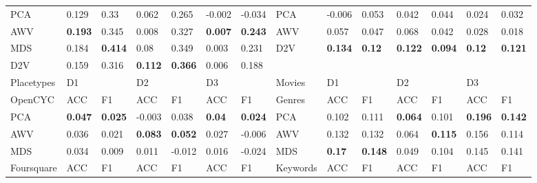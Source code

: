 \begin{landscape}
\begin{table}[]
\begin{tabular}{llllllllllllll}
		PCA        & 0.129          & 0.33           & 0.062          & 0.265          & -0.002         & -0.034         & PCA            & -0.006         & 0.053          & 0.042          & 0.044          & 0.024          & 0.032          \\
		AWV        & \textbf{0.193} & 0.345          & 0.008          & 0.327          & \textbf{0.007} & \textbf{0.243} & AWV            & 0.057          & 0.047          & 0.068          & 0.042          & 0.028          & 0.018          \\
		MDS        & 0.184          & \textbf{0.414} & 0.08           & 0.349          & 0.003          & 0.231          & D2V            & \textbf{0.134} & \textbf{0.12}  & \textbf{0.122} & \textbf{0.094} & \textbf{0.12}  & \textbf{0.121} \\
		D2V        & 0.159          & 0.316          & \textbf{0.112} & \textbf{0.366} & 0.006          & 0.188          &                &                &                &                &                &                &                \\
		Placetypes & D1             &                & D2             &                & D3             &                & Movies         & D1             &                & D2             &                & D3             &                \\
		OpenCYC    & ACC            & F1             & ACC            & F1             & ACC            & F1             & Genres         & ACC            & F1             & ACC            & F1             & ACC            & F1             \\
		PCA        & \textbf{0.047} & \textbf{0.025} & -0.003         & 0.038          & \textbf{0.04}  & \textbf{0.024} & PCA            & 0.102          & 0.111          & \textbf{0.064} & 0.101          & \textbf{0.196} & \textbf{0.142} \\
		AWV        & 0.036          & 0.021          & \textbf{0.083} & \textbf{0.052} & 0.027          & -0.006         & AWV            & 0.132          & 0.132          & 0.064          & \textbf{0.115} & 0.156          & 0.114          \\
		MDS        & 0.034          & 0.009          & 0.011          & -0.012         & 0.016          & -0.024         & MDS            & \textbf{0.17}  & \textbf{0.148} & 0.049          & 0.104          & 0.145          & 0.141          \\
		Foursquare & ACC            & F1             & ACC            & F1             & ACC            & F1             & Keywords       & ACC            & F1             & ACC            & F1             & ACC            & F1             \\

\end{tabular}
\end{table}
\end{landscape}
